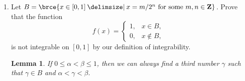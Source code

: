 \documentclass[a4paper]{article}
\begin{document}
\begin{enumerate}
  \begin{proof}
    Let \(P_1\) and \(P_2\) be partitions for \(s\) and \(t\) respectively.
    Let \(P = \brce{x_0, x_1, \dotsc, x_n}\) be the common refinement of
    \(P_1\) and \(P_2\).  Denote \(s(x) = s_k\) and \(t(x) = t_k\) for all
    \(x\) on every open interval \((x_{k-1}, x_k)\).  Then we have
    \begin{align*}
      \paren[\bigg]{\int_a^b s \cdot t}^2
        &= \brce*{\sum_{k=1}^n s_k t_k \paren{x_k - x_{k-1}}}^2 \\
        &= \brce*{\sum_{k=1}^n \paren[\big]{s_k \sqrt{x_k - x_{k-1}}} \paren[\big]{t_k \sqrt{x_k - x_{k-1}}}}^2 \\
        &\le \brce*{\sum_{k=1}^n s_k^2 \paren{x_k - x_{k-1}}} \brce*{\sum_{k=1}^n t_k^2 \paren{x_k - x_{k-1}}} \\
        &= \int_a^b s^2 \cdot \int_a^b t^2.
    \end{align*}
    The equality holds if and only if there exists a constant \(c\) such
    that
    \[
      s_k \sqrt{x_k - x_{k-1}} = c t_k \sqrt{x_k - x_{k-1}}
    \]
    for each \(k\).  Since \(x_k - x_{k-1} > 0\), we can cancel out the
    \(\sqrt{x_k - x_{k-1}}\) factor from both sides of the above equation
    and obtain \(s_k = c t_k\) for each \(k\).
  \end{proof}

\item[\bonus] Let
  \(B = \brce{x \in [0, 1] \mid x = m/2^n \text{ for some } m, n \in
    \mathbf{Z}}\).  Prove that the function
  \[
    f(x) =
    \begin{cases}
      1, & x \in B, \\
      0, & x \notin B,
    \end{cases}
  \]
  is not integrable on \([0, 1]\) by our definition of integrability.

  \newtheorem*{lemma}{Lemma}
  \begin{lemma}
    If \(0 \le \alpha < \beta \le 1 \), then we can always find a third
    number \(\gamma\) such that \(\gamma \in B\) and
    \(\alpha < \gamma < \beta\).
  \end{lemma}


\end{enumerate}
\end{document}
